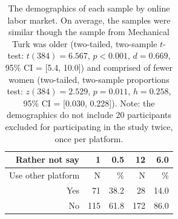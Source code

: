 \documentclass[a4paper,notitlepage,12pt]{article}
\begin{document}
\begin{table}[!h]
\begin{tabular}{ rrrrr }
        Rather not say                            &     1 &   0.5 &     12 &   6.0 \\
        \midrule
        Use other platform & N & \% & N & \% \\
        \cmidrule(lr){1-5}
        Yes            &      71 &  38.2 &       28 &  14.0 \\
        No             &     115 &  61.8 &      172 &  86.0 \\
        \bottomrule
    \end{tabular}
    \caption{The demographics of each sample by online labor market. On average, the samples were similar though the sample from Mechanical Turk was older (two-tailed, two-sample $t$-test: $t(384)=6.567$, $p<0.001$, $d=0.669$, 95\% CI = [5.4, 10.0]) and comprised of fewer women (two-tailed, two-sample proportions test: $z(384)=2.529$, $p=0.011$, $h=0.258$, 95\% CI = [0.030, 0.228]). Note: the demographics do not include 20 participants excluded for participating in the study twice, once per platform.}
    \label{tab:tabS01}
\end{table}

\clearpage
\end{document}
